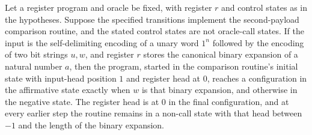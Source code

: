 \begin{lemma}
\label{Complexity.LogProg.jeqPairSnd_run}
\leanok
{}
Let a register program and oracle be fixed, with register $r$ and control states as in
the hypotheses. Suppose the specified transitions implement the second-payload
comparison routine, and the stated control states are not oracle-call states. If the
input is the self-delimiting encoding of a unary word $1^n$ followed by the encoding of
two bit strings $u,w$, and register $r$ stores the canonical binary expansion of a
natural number $a$, then the program, started in the comparison routine's initial state
with input-head position $1$ and register head at $0$, reaches a configuration in the
affirmative state exactly when $w$ is that binary expansion, and otherwise in the
negative state. The register head is at $0$ in the final configuration, and at every
earlier step the routine remains in a non-call state with that head between $-1$ and the
length of the binary expansion.
\end{lemma}

